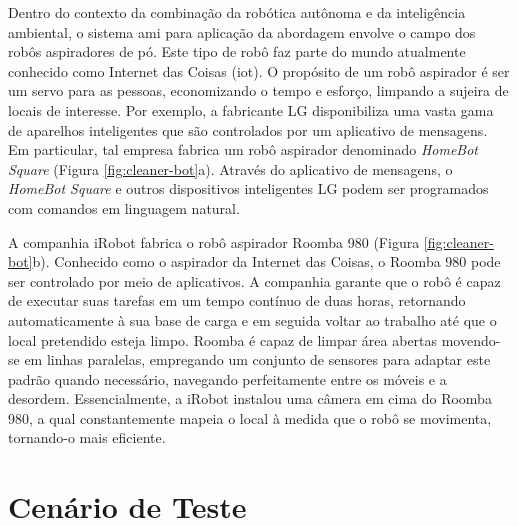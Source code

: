 Dentro do contexto da combinação da robótica autônoma e da inteligência ambiental, o sistema \acrshort{ami} para aplicação da abordagem envolve o campo dos robôs aspiradores de pó. Este tipo de robô faz parte do mundo atualmente conhecido como Internet das Coisas (\acrshort{iot}). O propósito de um robô aspirador é ser um servo para as pessoas, economizando o tempo e esforço, limpando a sujeira de locais de interesse. Por exemplo, a fabricante LG disponibiliza uma vasta gama de aparelhos inteligentes que são controlados por um aplicativo de mensagens. Em particular, tal empresa fabrica um robô aspirador denominado \textit{HomeBot Square}  (Figura \ref{fig:cleaner-bot}a). Através do aplicativo de mensagens, o \textit{HomeBot Square} e outros dispositivos inteligentes LG podem ser programados com comandos em linguagem natural.

\begin{figure}[h!]
    \centering
\end{figure}

A companhia iRobot fabrica o robô aspirador Roomba 980 (Figura \ref{fig:cleaner-bot}b). Conhecido como o aspirador da Internet das Coisas, o Roomba 980 pode ser controlado por meio de aplicativos. A companhia garante que o robô é capaz de executar suas tarefas em um tempo contínuo de duas horas, retornando automaticamente à sua base de carga e em seguida voltar ao trabalho até que o local pretendido esteja limpo. Roomba é capaz de limpar área abertas movendo-se em linhas paralelas, empregando um conjunto de sensores para adaptar este padrão quando necessário, navegando perfeitamente entre os móveis e a desordem. Essencialmente, a iRobot instalou uma câmera em cima do Roomba 980, a qual constantemente mapeia o local à medida que o robô se movimenta, tornando-o mais eficiente. 

\section{Cenário de Teste}
\label{sec:cenario-teste}

